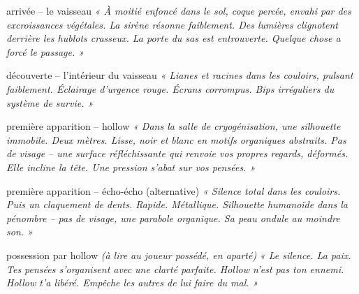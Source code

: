\documentclass[10pt, a4paper]{article}
\begin{document}
\begin{zonebox}{arrivée -- le vaisseau}
\textit{« À moitié enfoncé dans le sol, coque percée, envahi par des excroissances végétales. La sirène résonne faiblement. Des lumières clignotent derrière les hublots crasseux. La porte du sas est entrouverte. Quelque chose a forcé le passage. »}
\end{zonebox}

\begin{obstaclebox}{découverte -- l'intérieur du vaisseau}
\textit{« Lianes et racines dans les couloirs, pulsant faiblement. Éclairage d'urgence rouge. Écrans corrompus. Bips irréguliers du système de survie. »}
\end{obstaclebox}

\begin{creaturebox}{première apparition -- hollow}
\textit{« Dans la salle de cryogénisation, une silhouette immobile. Deux mètres. Lisse, noir et blanc en motifs organiques abstraits. Pas de visage -- une surface réfléchissante qui renvoie vos propres regards, déformés. Elle incline la tête. Une pression s'abat sur vos pensées. »}
\end{creaturebox}

\begin{creaturebox}{première apparition -- écho-écho (alternative)}
\textit{« Silence total dans les couloirs. Puis un claquement de dents. Rapide. Métallique. Silhouette humanoïde dans la pénombre -- pas de visage, une parabole organique. Sa peau ondule au moindre son. »}
\end{creaturebox}

\begin{momentbox}{possession par hollow}
\textit{(à lire au joueur possédé, en aparté)}
\textit{« Le silence. La paix. Tes pensées s'organisent avec une clarté parfaite. Hollow n'est pas ton ennemi. Hollow t'a libéré. Empêche les autres de lui faire du mal. »}
\end{momentbox}
\end{document}

